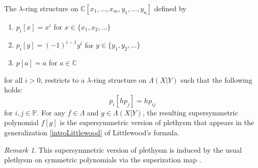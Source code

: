 \documentclass[12pt,reqno]{amsart}
\newtheorem{lemma}[theorem]{Lemma}
\newtheorem{proposition}[theorem]{Proposition}
\theoremstyle{definition}
\theoremstyle{remark}
\newtheorem{remark}[theorem]{Remark}
\begin{document}
The $\lambda$-ring structure on $\mathbb{C}[x_{1},\dotsc,x_{m},y_{1},\dotsc,y_{n}]$  defined by
\begin{enumerate}
    \item $p_{i}[x]=x^{i}$ for $x\in\{x_{1},x_{2},\dotsc\}$
    \item $p_{i}[y]=(-1)^{i-1}y^{i}$ for $y\in \{y_{1},y_{2},\dotsc\}$
    \item $p[a]=a$ for $a\in \mathbb{C}$
\end{enumerate}
for all $i>0$, restricts to a $\lambda$-ring structure on $\Lambda(X|Y)$ such that the following holds:
$$p_{i}[hp_{j}]=hp_{ij}$$ for $i,j\in\mathbb{P}$.
For any $f\in \Lambda$ and $g\in \Lambda(X|Y)$, the resulting supersymmetric polynomial $f[g]$ is the supersymmetric version of plethysm that appears in the generalization \eqref{introLittlewood} of Littlewood's formula.

\begin{remark}\label{superization}
    This supersymmetric version of plethysm is induced by the usual plethysm on symmetric polynomials via the superization map \cite[Definition 4.1]{haglund2005combinatorial}.
\end{remark}
\end{document}
